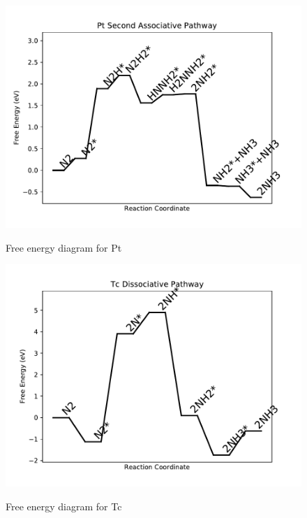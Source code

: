 \documentclass[journal=jacsat,manuscript=article]{achemso}
\begin{document}
\begin{figure}
\includegraphics[width=1\linewidth]{data/plots/Pt_associative_2.pdf}
\label{fig:Pt_associative_2}
\caption{Free energy diagram for Pt}
\end{figure}

\newpage
\begin{figure}
\includegraphics[width=1\linewidth]{data/plots/Tc_dissociative.pdf}
\label{fig:Tc_dissociative}
\caption{Free energy diagram for Tc}
\end{figure}
\end{document}
